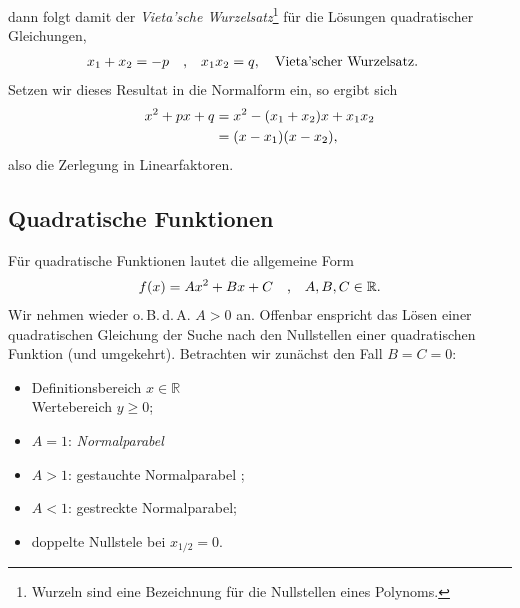 dann folgt damit der \emph{Vieta'sche Wurzelsatz}\footnote{Wurzeln sind eine Bezeichnung für die Nullstellen eines Polynoms.} für die Lösungen quadratischer Gleichungen, 
\begin{align}
    x_1 + x_2 = -p \qq{,} x_1 x_2 = q, \qq{Vieta'scher Wurzelsatz.}
\end{align}
Setzen wir dieses Resultat in die Normalform ein, so ergibt sich 
\begin{align}
        x^2 + px + q &= x^2 - (x_1 + x_2) x + x_1 x_2 \notag \\
        &= (x-x_1) (x-x_2), 
\end{align}
also die Zerlegung in Linearfaktoren.

\clearpage
\subsection{Quadratische Funktionen}

Für quadratische Funktionen lautet die allgemeine Form 
\begin{align}
    f(x) = Ax^2 + Bx + C \qq{,} A,B,C \in \mathbb{R}.
\end{align}
Wir nehmen wieder o.\,B.\,d.\,A. $A > 0$ an. Offenbar enspricht das Lösen einer quadratischen Gleichung der Suche nach den Nullstellen einer quadratischen Funktion (und umgekehrt). Betrachten wir zunächst den Fall $B = C = 0$: 

\begin{minipage}{0.45\textwidth}
    \begin{itemize}
        \item Definitionsbereich $x \in \mathbb{R}$ \\
        Wertebereich $y \ge 0$;
        \item $A = 1$: \emph{Normalparabel} 
        \item $A > 1$: gestauchte Normalparabel ;
        \item $A < 1$: gestreckte Normalparabel;
        \item doppelte Nullstele bei $x_{1/2} = 0.$
    \end{itemize}
\end{minipage}
\begin{minipage}{0.55\textwidth}
        \centering
\end{minipage}

